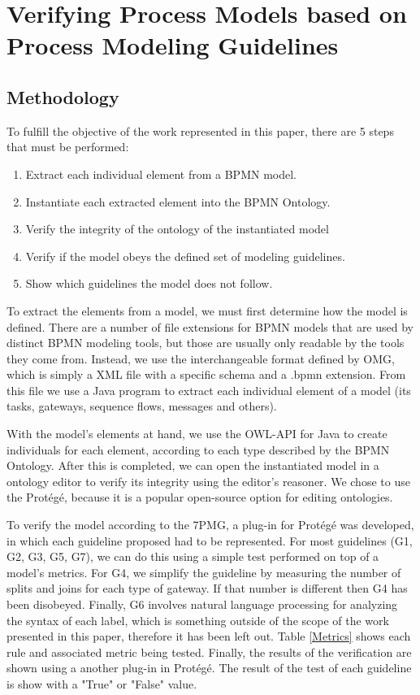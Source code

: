 \documentclass{llncs}
\begin{document}
\section{Verifying Process Models based on Process Modeling Guidelines}\label{Methodology}



\subsection{Methodology}
To fulfill the objective of the work represented in this paper, there are 5 steps that must be performed:

\begin{enumerate}
	\item Extract each individual element from a BPMN model.
	\item Instantiate each extracted element into the BPMN Ontology.
	\item Verify the integrity of the ontology of the instantiated model
	\item Verify if the model obeys the defined set of modeling guidelines.
	\item Show which guidelines the model does not follow.
\end{enumerate}

To extract the elements from a model, we must first determine how the model is defined. There are a number of file extensions for BPMN models that are used by distinct BPMN modeling tools, but those are usually only readable by the tools they come from. Instead, we use the interchangeable format defined by OMG, which is simply a XML file with a specific schema and a .bpmn extension. From this file we use a Java program to extract each individual element of a model (its tasks, gateways, sequence flows, messages and others).

With the model's elements at hand, we use the OWL-API for Java to create individuals for each element, according to each type described by the BPMN Ontology. After this is completed, we can open the instantiated model in a ontology editor to verify its integrity using the editor's reasoner. We chose to use the Protégé, because it is a popular open-source option for editing ontologies.




To verify the model according to the 7PMG, a plug-in for Protégé was developed, in which each guideline proposed had to be represented. For most guidelines (G1, G2, G3, G5, G7), we can do this using a simple test performed on top of a model's metrics. For G4, we simplify the guideline by measuring the number of splits and joins for each type of gateway. If that number is different then G4 has been disobeyed. Finally, G6 involves natural language processing for analyzing the syntax of each label, which is something outside of the scope of the work presented in this paper, therefore it has been left out. Table \ref{Metrics} shows each rule and associated metric being tested. Finally, the results of the verification are shown using a another plug-in in Protégé. The result of the test of each guideline is show with a "True" or "False" value.
\end{document}

